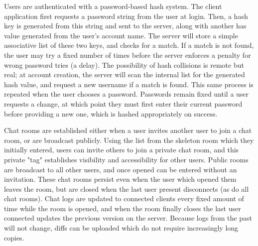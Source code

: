 \documentclass[12pt]{report}
\begin{document}
\begin{flushleft}
\indent Users are authenticated with a password-based hash system. The client application first requests a password string from the user at login. Then, a hash key is generated from this string and sent to the server, along with another has value generated from the user's account name. The server will store a simple associative list of these two keys, and checks for a match. If a match is not found, the user may try a fixed number of times before the server enforces a penalty for wrong password tries (a delay). The possibility of hash collisions is remote but real; at account creation, the server will scan the internal list for the generated hash value, and request a new username if a match is found. This same process is repeated when the user chooses a password. Passwords remain fixed until a user requests a change, at which point they must first enter their current password before providing a new one, which is hashed appropriately on success.%

\indent Chat rooms are established either when a user invites another user to join a chat room, or are broadcast publicly. Using the list from the skeleton room which they initially entered, users can invite others to join a private chat room, and this private "tag" establishes visibility and accessibility for other users. Public rooms are broadcast to all other users, and once opened can be entered without an invitation. These chat rooms persist even when the user which opened them leaves the room, but are closed when the last user present disconnects (as do all chat rooms). Chat logs are updated to connected clients every fixed amount of time while the room is opened, and when the room finally closes the last user connected updates the previous version on the server. Because logs from the past will not change, diffs can be uploaded which do not require increasingly long copies.


\end{flushleft}
\end{document}
